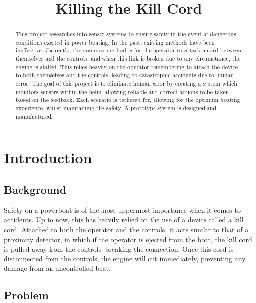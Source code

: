 \documentclass[10pt]{ecsprogressreport}
\begin{document}
\title{Killing the Kill Cord}
\maketitle

\begin{abstract}
This project researches into sensor systems to ensure safety in the event of dangerous conditions exerted in power boating. In the past, existing methods have been ineffective. Currently, the common method is for the operator to attach a cord between themselves and the controls, and when this link is broken due to any circumstance, the engine is stalled. This relies heavily on the operator remembering to attach the device to both themselves and the controls, leading to catastrophic accidents due to human error. The goal of this project is to eliminate human error by creating a system which monitors sensors within the helm, allowing reliable and correct actions to be taken based on the feedback. Each scenario is tethered for, allowing for the optimum boating experience, whilst maintaining the safety. A prototype system is designed and manufactured.
\end{abstract}

\tableofcontents

\chapter{Introduction}

\section{Background}

Safety on a powerboat is of the most uppermost importance when it comes to accidents. Up to now, this has heavily relied on the use of a device called a kill cord. Attached to both the operator and the controls, it acts similar to that of a proximity detector, in which if the operator is ejected from the boat, the kill cord is pulled away from the controls, breaking the connection. Once this cord is disconnected from the controls, the engine will cut immediately, preventing any damage from an uncontrolled boat.

\section{Problem}
\end{document}
